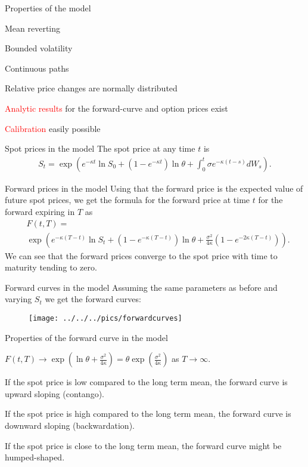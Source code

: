 {%
{Properties of the model}
\item<1-> Mean reverting
\item<2-> Bounded volatility
\item<3-> Continuous paths
\item<4-> Relative price changes are normally distributed
\item<5-> \textcolor{red}{Analytic results} for the forward-curve and option prices exist
\item<6-> \textcolor{red}{Calibration} easily possible


{Spot prices in the model}
The spot price at any time $t$ is
\begin{align*}
	S_t = \exp \left( e^{-\kappa t} \ln S_0 + (1-e^{-\kappa t}) \ln \theta + \int_0^t{\sigma e^{-\kappa (t-s)}}dW_s \right).
\end{align*}

{Forward prices in the model}
Using that the forward price is the expected value of future spot prices,
we get the formula for the forward price at time $t$ for the forward expiring in $T$ as
\begin{align*}
	&F(t,T) = \\
	&\exp \left( e^{-\kappa(T-t)} \ln S_t + (1-e^{-\kappa(T-t)}) \ln \theta + \frac{\sigma^2}{4\kappa}(1-e^{-2\kappa(T-t)}) \right).
\end{align*}
We can see that the forward prices converge to the spot price with time to maturity tending to zero.

{Forward curves in the model}
Assuming the same parameters as before and varying $S_t$ we get the forward curves:
\begin{figure}
	\centering
		\texttt{[image: ../../../pics/forwardcurves]}
	\label{fig:forwardcurves}
\end{figure}

{Properties of the forward curve in the model}
\item<1-> $F(t,T) \rightarrow \exp(\ln \theta + \frac{\sigma^2}{4 \kappa}) = \theta \exp{(\frac{\sigma^2}{4\kappa})}$ as $T \rightarrow \infty$.
\item<2-> If the spot price is low compared to the long term mean, the forward curve is upward sloping (contango).
\item<3-> If the spot price is high compared to the long term mean, the forward curve is downward sloping (backwardation).
\item<4-> If the spot price is close to the long term mean, the forward curve might be humped-shaped.

}
